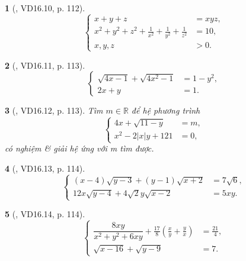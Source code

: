 \documentclass{article}
\newtheorem{baitoan}{}
\begin{document}
\begin{baitoan}[\cite{TLCT_THCS_Toan_9_dai_so}, VD16.10, p. 112]
	\begin{equation*}
		\left\{\begin{split}
			x + y + z &= xyz,\\
			x^2 + y^2 + z^2 + \frac{1}{x^2} + \frac{1}{y^2} + \frac{1}{z^2} &= 10,\\
			x,y,z &> 0.
		\end{split}\right.
	\end{equation*}
\end{baitoan}

\begin{baitoan}[\cite{TLCT_THCS_Toan_9_dai_so}, VD16.11, p. 113]
	\begin{equation*}
		\left\{\begin{split}
			\sqrt{4x - 1} + \sqrt{4x^2 - 1} &= 1 - y^2,\\
			2x + y &= 1.
		\end{split}\right.
	\end{equation*}
\end{baitoan}

\begin{baitoan}[\cite{TLCT_THCS_Toan_9_dai_so}, VD16.12, p. 113]
	Tìm $m\in\mathbb{R}$ để hệ phương trình
	\begin{equation*}
		\left\{\begin{split}
			4x + \sqrt{11 - y} &= m,\\
			x^2 - 2|x|y + 121 &= 0,
		\end{split}\right.
	\end{equation*}
	có nghiệm \& giải hệ ứng với m tìm được.
\end{baitoan}

\begin{baitoan}[\cite{TLCT_THCS_Toan_9_dai_so}, VD16.13, p. 114]
	\begin{equation*}
		\left\{\begin{split}
			(x - 4)\sqrt{y - 3} + (y - 1)\sqrt{x + 2} &= 7\sqrt{6},\\
			12x\sqrt{y - 4} + 4\sqrt{2}y\sqrt{x - 2} &= 5xy.
		\end{split}\right.
	\end{equation*}
\end{baitoan}

\begin{baitoan}[\cite{TLCT_THCS_Toan_9_dai_so}, VD16.14, p. 114]
	\begin{equation*}
		\left\{\begin{split}
			\dfrac{8xy}{x^2 + y^2 + 6xy} + \frac{17}{8}\left(\frac{x}{y} + \frac{y}{x}\right) &= \frac{21}{4},\\
			\sqrt{x - 16} + \sqrt{y - 9} &= 7.
		\end{split}\right.
	\end{equation*}
\end{baitoan}
\end{document}
